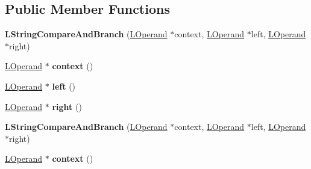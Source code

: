 \subsection*{Public Member Functions}
\begin{DoxyCompactItemize}
\item 
{\bfseries L\+String\+Compare\+And\+Branch} (\hyperlink{classv8_1_1internal_1_1_l_operand}{L\+Operand} $\ast$context, \hyperlink{classv8_1_1internal_1_1_l_operand}{L\+Operand} $\ast$left, \hyperlink{classv8_1_1internal_1_1_l_operand}{L\+Operand} $\ast$right)\hypertarget{classv8_1_1internal_1_1_l_string_compare_and_branch_abdd07c36cdda51e9673d4ee4dfc2734d}{}\label{classv8_1_1internal_1_1_l_string_compare_and_branch_abdd07c36cdda51e9673d4ee4dfc2734d}

\item 
\hyperlink{classv8_1_1internal_1_1_l_operand}{L\+Operand} $\ast$ {\bfseries context} ()\hypertarget{classv8_1_1internal_1_1_l_string_compare_and_branch_a15d4b6ad859b22bf4141edc055fe8050}{}\label{classv8_1_1internal_1_1_l_string_compare_and_branch_a15d4b6ad859b22bf4141edc055fe8050}

\item 
\hyperlink{classv8_1_1internal_1_1_l_operand}{L\+Operand} $\ast$ {\bfseries left} ()\hypertarget{classv8_1_1internal_1_1_l_string_compare_and_branch_a03846e908189b71209c862508f37b51a}{}\label{classv8_1_1internal_1_1_l_string_compare_and_branch_a03846e908189b71209c862508f37b51a}

\item 
\hyperlink{classv8_1_1internal_1_1_l_operand}{L\+Operand} $\ast$ {\bfseries right} ()\hypertarget{classv8_1_1internal_1_1_l_string_compare_and_branch_acb46bd2af08a91bc102ec2b5e919c6b5}{}\label{classv8_1_1internal_1_1_l_string_compare_and_branch_acb46bd2af08a91bc102ec2b5e919c6b5}

\item 
{\bfseries L\+String\+Compare\+And\+Branch} (\hyperlink{classv8_1_1internal_1_1_l_operand}{L\+Operand} $\ast$context, \hyperlink{classv8_1_1internal_1_1_l_operand}{L\+Operand} $\ast$left, \hyperlink{classv8_1_1internal_1_1_l_operand}{L\+Operand} $\ast$right)\hypertarget{classv8_1_1internal_1_1_l_string_compare_and_branch_abdd07c36cdda51e9673d4ee4dfc2734d}{}\label{classv8_1_1internal_1_1_l_string_compare_and_branch_abdd07c36cdda51e9673d4ee4dfc2734d}

\item 
\hyperlink{classv8_1_1internal_1_1_l_operand}{L\+Operand} $\ast$ {\bfseries context} ()\hypertarget{classv8_1_1internal_1_1_l_string_compare_and_branch_a15d4b6ad859b22bf4141edc055fe8050}{}\label{classv8_1_1internal_1_1_l_string_compare_and_branch_a15d4b6ad859b22bf4141edc055fe8050}


\end{DoxyCompactItemize}
